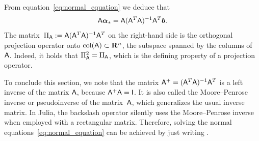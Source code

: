 \begin{remark}
From equation~\eqref{eq:normal_equation} we deduce that
\[
    \mathsf A \mathbf{\boldsymbol{\alpha}}_* = \mathsf A (\mathsf A^T \mathsf A)^{-1} \mathsf A^T \mathbf{\boldsymbol{b}}.
\]
The matrix~$\Pi_{\mathsf A} := \mathsf A (\mathsf A^T \mathsf A)^{-1} \mathsf A^T$ on the right-hand side is the orthogonal projection operator onto $\operatorname{col}(\mathsf A) \subset \mathbf R^n$,
the subspace spanned by the columns of~$\mathsf A$.
Indeed, it holds that $\Pi_{\mathsf A}^2 = \Pi_{\mathsf A}$,
which is the defining property of a projection operator.
\end{remark}

To conclude this section,
we note that the matrix $\mathsf A^{+} = (\mathsf A^T \mathsf A)^{-1} \mathsf A^T$ is a left inverse of the matrix $\mathsf A$,
because $\mathsf A^+ \mathsf A = \mathsf I$.
It is also called the Moore--Penrose inverse or pseudoinverse of the matrix~$\mathsf A$,
which generalizes the usual inverse matrix.
In Julia, the backslash operator silently uses the Moore--Penrose inverse when employed with a rectangular matrix.
Therefore, solving the normal equations~\eqref{eq:normal_equation} can be achieved by just writing .

